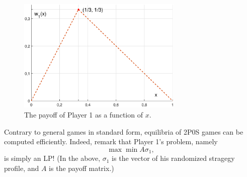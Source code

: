 \begin{example}
\begin{figure}[!ht]
\centering
\includegraphics[width = 0.7\textwidth]{figP2OS.eps}
\caption{The payoff of Player 1 as a function of $x$.}
\label{chap3:figP2OS}
\end{figure}


\end{example}
Contrary to general games in standard form, equilibria of 2P0S games can be computed efficiently.  Indeed, remark that Player 1's problem, namely $$ \max{\min{ A \sigma_1}} ,$$ is simply an LP!  (In the above, $\sigma_1$ is the vector of his randomized stragegy profile, and $A$ is the payoff matrix.)


\ifx \globalmark \undefined %


	
\else

\fi
